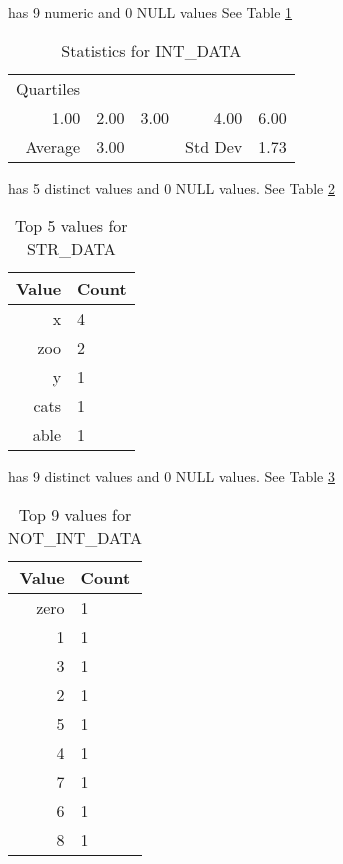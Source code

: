 \item[INT\_DATA] has 9 numeric and 0 NULL values
See Table \ref{tab:INTDATA}
\begin{table}[ht]
\caption{Statistics for INT\_DATA} \label{tab:INTDATA}
\centering
\begin{tabular}{|rrrrr|}
\hline
Quartiles & & & &  \\
1.00 & 2.00 & 3.00 & 4.00 & 6.00 \\
\hline
Average & 3.00 & & Std Dev & 1.73 \\
\hline
\end{tabular}
\end{table}
\item[STR\_DATA] has 5 distinct values and 0 NULL values.
See Table \ref{tab:STRDATA}
\begin{table}
\caption{Top 5 values for STR\_DATA} \label{tab:STRDATA}
\centering
\begin{tabular}{|r|l|}
\hline
Value & Count \\
\hline
x & 4 \\
zoo & 2 \\
y & 1 \\
cats & 1 \\
able & 1 \\
\hline
\end{tabular}
\end{table}
\item[NOT\_INT\_DATA] has 9 distinct values and 0 NULL values.
See Table \ref{tab:NOTINTDATA}
\begin{table}
\caption{Top 9 values for NOT\_INT\_DATA} \label{tab:NOTINTDATA}
\centering
\begin{tabular}{|r|l|}
\hline
Value & Count \\
\hline
zero & 1 \\
1 & 1 \\
3 & 1 \\
2 & 1 \\
5 & 1 \\
4 & 1 \\
7 & 1 \\
6 & 1 \\
8 & 1 \\
\hline
\end{tabular}
\end{table}
